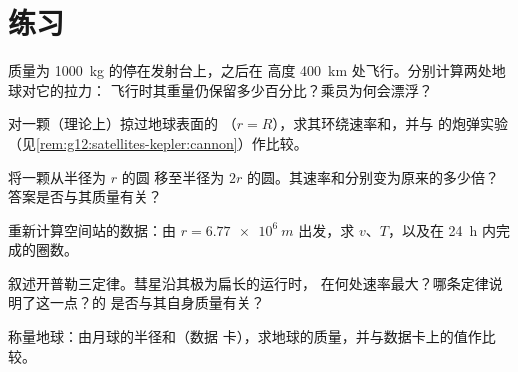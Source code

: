 \section{练习}

\begin{exercise}[$\star$]\label{exo:g12:satellites-kepler:1}
质量为 \qty{1000}{kg} 的停在发射台上，之后在
高度 \qty{400}{km} 处飞行。分别计算两处地球对它的拉力：
飞行时其重量仍保留多少百分比？乘员为何会漂浮？
\end{exercise}

\begin{exercise}[$\star$]\label{exo:g12:satellites-kepler:2}
对一颗（理论上）掠过地球表面的
（$r = R$），求其环绕速率和，并与
的炮弹实验（见\cref{rem:g12:satellites-kepler:cannon}）作比较。
\end{exercise}

\begin{exercise}[$\star$]\label{exo:g12:satellites-kepler:3}
将一颗从半径为 $r$ 的圆
移至半径为 $2r$ 的圆。其速率和分别变为原来的多少倍？
答案是否与其质量有关？
\end{exercise}

\begin{exercise}[$\star$]\label{exo:g12:satellites-kepler:4}
重新计算空间站的数据：由 $r = \qty{6.77e6}{m}$ 出发，求
$v$、$T$，以及在 \qty{24}{h} 内完成的圈数。
\end{exercise}

\begin{exercise}[$\star$]\label{exo:g12:satellites-kepler:5}
叙述开普勒三定律。彗星沿其极为扁长的运行时，
在何处速率最大？哪条定律说明了这一点？的
是否与其自身质量有关？
\end{exercise}

\begin{exercise}[$\star\star$]\label{exo:g12:satellites-kepler:6}
称量地球：由月球的半径和（数据
卡），求地球的质量，并与数据卡上的值作比较。
\end{exercise}

